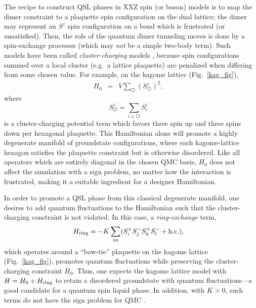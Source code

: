 \documentclass[10pt,pre,aps,twocolumn,showpacs,superscriptaddress,floatfix]{revtex4-1}
\begin{document}
The recipe to construct QSL phases in XXZ spin (or boson) models is to map the dimer constraint to a plaquette spin configuration on the dual lattice; the dimer may represent an $S^z$ spin configuration on a bond which is frustrated (or unsatisfied).  Then, the role of the quantum dimer tunneling moves is done by a spin-exchange processes (which may {\it not} be a simple two-body term).  Such models have been called
{\it cluster-charging} models \cite{Isakov2}, because spin configurations summed over a local cluster (e.g.~a lattice plaquette) are penalized when differing from some chosen value.  For example, on the kagome lattice (Fig.~\ref{kag_fig}),
\begin{eqnarray}
H_0 &=& V \sum_{\hexagon} (S^z_{\hexagon})^2,  \label{H0}
\end{eqnarray}
where 
\begin{equation}
S^z_{\hexagon} = \sum_{i \in \hexagon}S^z_i
\end{equation}
is a cluster-charging potential term which favors three spin up and three spins down per hexagonal plaquette.  This Hamiltonian alone will promote a highly degenerate manifold of groundstate configurations, where each kagome-lattice hexagon satisfies the plaquette constraint but is otherwise disordered.  
Like all operators which are entirely diagonal in the chosen QMC basis, $H_0$ does not affect the simulation with a sign problem, no matter how the interaction is frustrated, making it a suitable ingredient for a designer Hamiltonian.

In order to promote a QSL phase from this classical degenerate manifold, one desires to add quantum fluctuations to the Hamiltonian such that the cluster-charging constraint is not violated.  In this case, a {\it ring-exchange} term, 
\begin{eqnarray}
H_{\rm ring} = -K \sum_{\bowtie} ( S_i^{+} S_j^{-} S_k^{+} S_l^{-} + {\rm h.c.} ),
\end{eqnarray} 
which operates around a ``bow-tie'' plaquette on the kagome lattice (Fig.~\ref{kag_fig}),
promotes quantum fluctuations while preserving the cluster-charging constraint $H_0$.  Thus, one expects the kagome lattice model with $H = H_0 + H_{\rm ring}$ to retain a disordered groundstate with quantum fluctuations---a good candidate for a quantum spin liquid phase.  In addition, with $K>0$, such terms do not have the sign problem for QMC \cite{JKqmc}.
\end{document}
